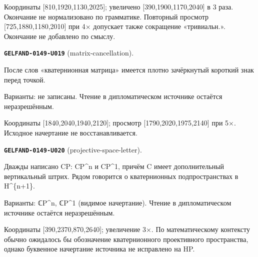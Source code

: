 \documentclass[11pt]{article}
\theoremstyle{definition}
\theoremstyle{remark}
\begin{document}
Координаты [810,1920,1130,2025]; увеличено [390,1900,1170,2040] в 3 раза. Окончание не нормализовано по грамматике. Повторный просмотр [725,1880,1180,2010] при 4× допускает также сокращение «тривиальн.». Окончание не добавлено по смыслу.\par\medskip
\noindent\leavevmode{}\label{GELFAND-P001371:matrix-cancellation:note}\textbf{\texttt{GELFAND-0149-U019}} (matrix-cancellation).\par\nopagebreak[4]
После слов «кватернионная матрица» имеется плотно зачёркнутый короткий знак перед точкой.\par
Варианты: не записаны. Чтение в дипломатическом источнике остаётся неразрешённым.\par
Координаты [1840,2040,1940,2120]; просмотр [1790,2020,1975,2140] при 5×. Исходное начертание не восстанавливается.\par\medskip
\noindent\leavevmode{}\label{GELFAND-P001371:projective-space-letter:note}\textbf{\texttt{GELFAND-0149-U020}} (projective-space-letter).\par\nopagebreak[4]
Дважды написано CP: CP\textasciicircum{}n и CP\textasciicircum{}1, причём C имеет дополнительный вертикальный штрих. Рядом говорится о кватернионных подпространствах в H\textasciicircum{}\{n+1\}.\par
Варианты: ℂP\textasciicircum{}n, ℂP\textasciicircum{}1 (видимое начертание). Чтение в дипломатическом источнике остаётся неразрешённым.\par
Координаты [390,2370,870,2640]; увеличение 3×. По математическому контексту обычно ожидалось бы обозначение кватернионного проективного пространства, однако буквенное начертание источника не исправлено на HP.\par\medskip
\end{document}
